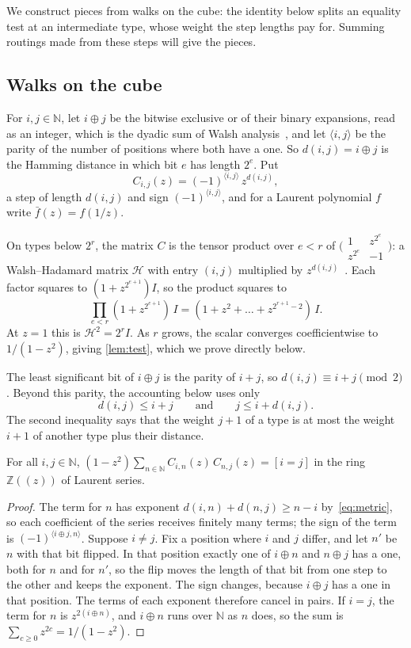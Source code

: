 \documentclass[11pt]{article}
\theoremstyle{definition}
\theoremstyle{definition}
\theoremstyle{remark}
\newcommand{\Z}{\mathbb{Z}}
\newcommand{\N}{\mathbb{N}}
\newcommand{\ip}[2]{\langle #1,#2\rangle}
\begin{document}
We construct pieces from walks on the cube: the identity below splits an equality test at an intermediate type, whose weight the step lengths pay for. Summing routings made from these steps will give the pieces.

\subsection{Walks on the cube}

For $i,j\in\N$, let $i\oplus j$ be the bitwise exclusive or of their binary expansions, read as an integer, which is the dyadic sum of Walsh analysis~\cite{SWS90}, and let $\ip ij$ be the parity of the number of positions where both have a one. So $d(i,j)=i\oplus j$ is the Hamming distance in which bit $e$ has length $2^e$. Put
\[
C_{i,j}(z)=(-1)^{\ip ij}\,z^{d(i,j)},
\]
a step of length $d(i,j)$ and sign $(-1)^{\ip ij}$, and for a Laurent polynomial $f$ write $\bar f(z)=f(1/z)$.

On types below $2^r$, the matrix $C$ is the tensor product over $e<r$ of $\bigl(\begin{smallmatrix}1&z^{2^e}\\z^{2^e}&-1\end{smallmatrix}\bigr)$: a Walsh--Hadamard matrix $\mathcal H$ with entry $(i,j)$ multiplied by $z^{d(i,j)}$~\cite{SWS90}. Each factor squares to $(1+z^{2^{e+1}})I$, so the product squares to
\[
\prod_{e<r}(1+z^{2^{e+1}})\,I
=(1+z^2+\dots+z^{2^{r+1}-2})\,I.
\]
At $z=1$ this is $\mathcal H^2=2^rI$. As $r$ grows, the scalar converges coefficientwise to $1/(1-z^2)$, giving \cref{lem:test}, which we prove directly below.

The least significant bit of $i\oplus j$ is the parity of $i+j$, so $d(i,j)\equiv i+j\pmod 2$. Beyond this parity, the accounting below uses only
\begin{equation}\label{eq:metric}
d(i,j)\le i+j\qquad\text{and}\qquad j\le i+d(i,j).
\end{equation}
The second inequality says that the weight $j+1$ of a type is at most the weight $i+1$ of another type plus their distance.

\begin{lemma}\label{lem:test}
For all $i,j\in\N$, $(1-z^2)\sum_{n\in\N}C_{i,n}(z)\,C_{n,j}(z)=[i=j]$ in the ring $\Z((z))$ of Laurent series.
\end{lemma}

\begin{proof}
The term for $n$ has exponent $d(i,n)+d(n,j)\ge n-i$ by~\eqref{eq:metric}, so each coefficient of the series receives finitely many terms; the sign of the term is $(-1)^{\ip{i\oplus j}n}$. Suppose $i\ne j$. Fix a position where $i$ and $j$ differ, and let $n'$ be $n$ with that bit flipped. In that position exactly one of $i\oplus n$ and $n\oplus j$ has a one, both for $n$ and for $n'$, so the flip moves the length of that bit from one step to the other and keeps the exponent. The sign changes, because $i\oplus j$ has a one in that position. The terms of each exponent therefore cancel in pairs. If $i=j$, the term for $n$ is $z^{2(i\oplus n)}$, and $i\oplus n$ runs over $\N$ as $n$ does, so the sum is $\sum_{c\ge0}z^{2c}=1/(1-z^2)$.
\end{proof}
\end{document}
